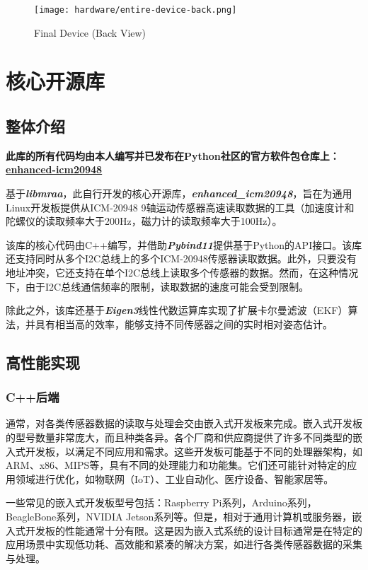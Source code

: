 \begin{figure}[H]
    \centering
    \texttt{[image: hardware/entire-device-back.png]}
    \caption{\label{fig:entire-device-back}Final Device (Back View)}
\end{figure}

\cleardoublepage
\section{核心开源库}
\subsection{整体介绍}
{\bfseries 此库的所有代码均由本人编写并已发布在Python社区的官方软件包仓库上：\href{https://pypi.org/project/enhanced-icm20948/}{enhanced-icm20948}}

基于{\textbf \itshape libmraa}，此自行开发的核心开源库，{\textbf \itshape enhanced\_icm20948}，旨在为通用Linux开发板提供从ICM-20948 9轴运动传感器高速读取数据的工具（加速度计和陀螺仪的读取频率大于200Hz，磁力计的读取频率大于100Hz）。

该库的核心代码由C++编写，并借助{\bfseries \itshape Pybind11}提供基于Python的API接口。该库还支持同时从多个I2C总线上的多个ICM-20948传感器读取数据。此外，只要没有地址冲突，它还支持在单个I2C总线上读取多个传感器的数据。然而，在这种情况下，由于I2C总线通信频率的限制，读取数据的速度可能会受到限制。

除此之外，该库还基于{\bfseries \itshape Eigen3}线性代数运算库实现了扩展卡尔曼滤波（EKF）算法，并具有相当高的效率，能够支持不同传感器之间的实时相对姿态估计。

\subsection{高性能实现}
\subsubsection{C++后端}
通常，对各类传感器数据的读取与处理会交由嵌入式开发板来完成。嵌入式开发板的型号数量非常庞大，而且种类各异。各个厂商和供应商提供了许多不同类型的嵌入式开发板，以满足不同应用和需求。这些开发板可能基于不同的处理器架构，如ARM、x86、MIPS等，具有不同的处理能力和功能集。它们还可能针对特定的应用领域进行优化，如物联网（IoT）、工业自动化、医疗设备、智能家居等。

一些常见的嵌入式开发板型号包括：Raspberry Pi系列，Arduino系列，BeagleBone系列，NVIDIA Jetson系列等。但是，相对于通用计算机或服务器，嵌入式开发板的性能通常十分有限。这是因为嵌入式系统的设计目标通常是在特定的应用场景中实现低功耗、高效能和紧凑的解决方案，如进行各类传感器数据的采集与处理。

